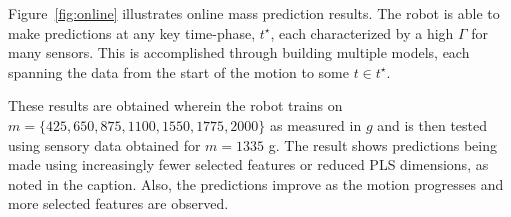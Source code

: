 
Figure~\ref{fig:online} illustrates online mass prediction results. The robot is able to make predictions at any key time-phase, $t^{\star}$, each characterized by a high $\Gamma$ for many sensors. This is accomplished through building multiple models, each spanning the data from the start of the motion to some $t \in t^{\star}$.

These results are obtained wherein the robot trains on $m = \{425, 650, 875, 1100, 1550, 1775, 2000\}$ as measured in $g$ and is then tested using sensory data obtained for $m=1335$ g.
The result shows predictions being made using increasingly fewer selected features or reduced PLS dimensions, as noted in the caption.
Also, the predictions improve as the motion progresses and more selected features are observed.  

